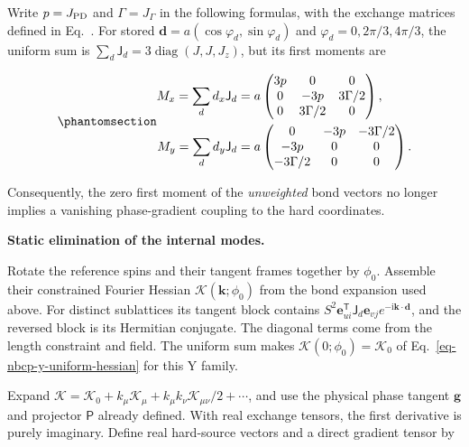 Write \(p=J_{\rm PD}\) and \(\Gamma=J_\Gamma\) in the following
formulas, with the exchange matrices defined in
Eq.~. For stored
\(\mathbf d=a(\cos\varphi_d,\sin\varphi_d)\) and
\(\varphi_d=0,2\pi/3,4\pi/3\), the uniform sum is
\(\sum_d\mathsf J_d=3\operatorname{diag}(J,J,J_z)\), but its first
moments are

\begin{equation}\phantomsection\label{eq-nbcp-y-soc-first-moments}{
\begin{aligned}
M_x=\sum_d d_x\mathsf J_d
&=a\begin{pmatrix}3p&0&0\\0&-3p&3\Gamma/2\\0&3\Gamma/2&0\end{pmatrix},\\
M_y=\sum_d d_y\mathsf J_d
&=a\begin{pmatrix}0&-3p&-3\Gamma/2\\-3p&0&0\\-3\Gamma/2&0&0\end{pmatrix}.
\end{aligned}
}\end{equation}

Consequently, the zero first moment of the \emph{unweighted} bond
vectors no longer implies a vanishing phase-gradient coupling to the
hard coordinates.

\textbf{Static elimination of the internal modes.}

Rotate the reference spins and their tangent frames together by
\(\phi_0\). Assemble their constrained Fourier Hessian
\(\mathcal K(\mathbf k;\phi_0)\) from the bond expansion used above. For
distinct sublattices its tangent block contains
\(S^2\mathbf e_{u i}^{\mathsf T}\mathsf J_d\mathbf e_{v j}e^{-\mathrm i\mathbf k\cdot\mathbf d}\),
and the reversed block is its Hermitian conjugate. The diagonal terms
come from the length constraint and field. The uniform sum makes
\(\mathcal K(0;\phi_0)=\mathcal K_0\) of
Eq.~\ref{eq-nbcp-y-uniform-hessian} for this Y family.

Expand
\(\mathcal K=\mathcal K_0+k_\mu\mathcal K_\mu+k_\mu k_\nu\mathcal K_{\mu\nu}/2+\cdots\),
and use the physical phase tangent \(\mathbf g\) and projector
\(\mathsf P\) already defined. With real exchange tensors, the first
derivative is purely imaginary. Define real hard-source vectors and a
direct gradient tensor by

